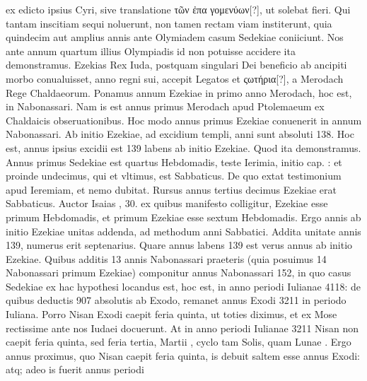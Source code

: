 ex edicto ipsius Cyri, sive translatione \textgreek{τῶν ἐπα γομενύων[?]},
ut solebat fieri.
Qui tantam inscitiam sequi noluerunt, non tamen rectam viam
institerunt, quia quindecim aut amplius annis ante  Olymiadem
casum Sedekiae coniiciunt.
Nos ante annum quartum illius
Olympiadis id non potuisse accidere ita demonstramus. 
Ezekias
Rex Iuda, postquam singulari Dei beneficio ab ancipiti morbo conualuisset,
anno  regni sui, accepit Legatos et \textgreek{ςωτήρια[?]}, a
Merodach Rege Chaldaeorum.
Ponamus  annum Ezekiae in
primo anno Merodach, hoc est, in  Nabonassari.
Nam is est
annus primus Merodach apud Ptolemaeum ex Chaldaicis obseruationibus. 
Hoc modo annus primus Ezekiae conuenerit in annum
 Nabonassari.
Ab initio Ezekiae, ad excidium templi, anni
sunt absoluti 138.
Hoc est, annus ipsius excidii est 139 labens ab initio
Ezekiae.
Quod ita demonstramus. 
Annus primus Sedekiae est
quartus Hebdomadis, teste Ierimia, initio cap. : et proinde
undecimus, qui et vltimus, est Sabbaticus. 
De quo extat testimonium
apud Ieremiam, et nemo dubitat.
Rursus annus tertius decimus
Ezekiae erat Sabbaticus. 
Auctor Isaias , 30.
 ex quibus
manifesto colligitur,  Ezekiae esse primum Hebdomadis, et primum
Ezekiae esse sextum Hebdomadis. 
Ergo annis ab initio Ezekiae unitas addenda, ad methodum anni Sabbatici.
Addita unitate annis
139, numerus erit septenarius. 
Quare annus labens 139 est verus
annus ab initio Ezekiae.
Quibus additis 13 annis Nabonassari praeteris
(quia posuimus 14 Nabonassari primum Ezekiae) componitur
annus Nabonassari 152, in quo casus Sedekiae ex hac hypothesi
locandus est, hoc est, in anno periodi Iulianae %
 4118: de quibus deductis
907 absolutis ab Exodo, remanet annus Exodi 3211 in periodo Iuliana.
Porro Nisan Exodi caepit feria quinta, ut toties diximus, et ex
Mose rectissime ante nos Iudaei %
 docuerunt.
At in anno periodi Iulianae %
3211 Nisan non caepit feria quinta, sed feria tertia,
 Martii , cyclo tam
Solis, quam Lunae .
Ergo annus proximus, quo Nisan caepit feria
quinta, is debuit saltem esse annus Exodi: atq; adeo is fuerit annus periodi
